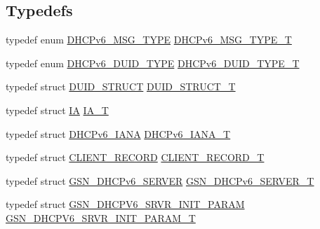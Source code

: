 \subsection*{Typedefs}
\begin{DoxyCompactItemize}
\item 
typedef enum \hyperlink{a00483_a89b22bc5b092a112c58f8ddd7dc17936}{DHCPv6\_\-MSG\_\-TYPE} \hyperlink{a00483_a1d34617a35a60e4b2a0ee8785a17cb8b}{DHCPv6\_\-MSG\_\-TYPE\_\-T}
\item 
typedef enum \hyperlink{a00483_afdbd2a591347668dffb23033d02a22c9}{DHCPv6\_\-DUID\_\-TYPE} \hyperlink{a00483_ad41483530dbb704887473bc9d5073275}{DHCPv6\_\-DUID\_\-TYPE\_\-T}
\item 
typedef struct \hyperlink{a00017}{DUID\_\-STRUCT} \hyperlink{a00483_a0e7dca41960d2d738d6e2afd7ac33dd3}{DUID\_\-STRUCT\_\-T}
\item 
typedef struct \hyperlink{a00448}{IA} \hyperlink{a00483_a951b7e63d22940987031a8c0cc927cd4}{IA\_\-T}
\item 
typedef struct \hyperlink{a00012}{DHCPv6\_\-IANA} \hyperlink{a00483_a3bf2eaff124af92a0ffcaeee86f2850c}{DHCPv6\_\-IANA\_\-T}
\item 
typedef struct \hyperlink{a00011}{CLIENT\_\-RECORD} \hyperlink{a00483_ad3e7a26d9bf9eabc18531f08fabd4444}{CLIENT\_\-RECORD\_\-T}
\item 
typedef struct \hyperlink{a00047}{GSN\_\-DHCPv6\_\-SERVER} \hyperlink{a00483_af7a0320c7608bfa8adb8049320a2f721}{GSN\_\-DHCPv6\_\-SERVER\_\-T}
\item 
typedef struct \hyperlink{a00048}{GSN\_\-DHCPV6\_\-SRVR\_\-INIT\_\-PARAM} \hyperlink{a00483_a564505e22308b59f2e2b53b49b96a9d7}{GSN\_\-DHCPV6\_\-SRVR\_\-INIT\_\-PARAM\_\-T}
\end{DoxyCompactItemize}
